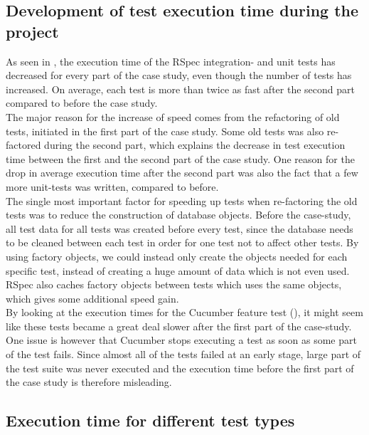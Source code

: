 
\subsection{Development of test execution time during the project}

As seen in , the execution time of the RSpec
integration- and unit tests has decreased for every part of the case
study, even though the number of tests has increased. On average, each
test is more than twice as fast after the second part compared to before
the case study.\\

The major reason for the increase of speed comes from the refactoring of
old tests, initiated in the first part of the case study. Some old tests
was also re-factored during the second part, which explains the decrease
in test execution time between the first and the second part of the case
study. One reason for the drop in average execution time after the
second part was also the fact that a few more unit-tests was written,
compared to before.\\

The single most important factor for speeding up tests when re-factoring
the old tests was to reduce the construction of database objects. Before
the case-study, all test data for all tests was created before every
test, since the database needs to be cleaned between each test in order
for one test not to affect other tests. By using factory objects, we
could instead only create the objects needed for each specific test,
instead of creating a huge amount of data which is not even used. RSpec
also caches factory objects between tests which uses the same objects,
which gives some additional speed gain.\\

By looking at the execution times for the Cucumber feature test
(), it might seem like these tests became a
great deal slower after the first part of the case-study. One issue is
however that Cucumber stops executing a test as soon as some part of the
test fails. Since almost all of the tests failed at an early stage,
large part of the test suite was never executed and the execution time
before the first part of the case study is therefore misleading.\\


\subsection{Execution time for different test types}

